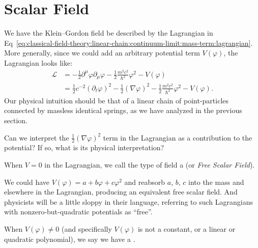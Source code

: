 \section{Scalar Field}

\M
We have the Klein--Gordon field
be described by the Lagrangian in
Eq~\eqref{eq:classical-field-theory:linear-chain:continuum-limit:mass-term:lagrangian}.
More generally, since we could add an arbitrary potential term
$V(\varphi)$, the Lagrangian looks like:
\begin{equation}\label{eq:classical-field-theory:scalar-field:lagrangian}
\begin{split}
  \mathcal{L} &= -\frac{1}{2}\partial^{\mu}\varphi\partial_{\mu}\varphi
-\frac{1}{2}\frac{m^{2}c^{2}}{\hbar^{2}}\varphi^{2} - V(\varphi)\\
&=\frac{1}{2}c^{-2}(\partial_{t}\varphi)^{2}-\frac{1}{2}(\nabla\varphi)^{2}
-\frac{1}{2}\frac{m^{2}c^{2}}{\hbar^{2}}\varphi^{2} - V(\varphi).
\end{split}
\end{equation}
Our physical intuition should be that of a linear chain of
point-particles connected by massless identical springs, as we have
analyzed in the previous section.

\begin{exercise}
Can we interpret the $\frac{1}{2}(\nabla\varphi)^{2}$ term in the
Lagrangian as a contribution to the potential? If so, what is its
physical interpretation?
\end{exercise}

\begin{definition}
When $V=0$ in the Lagrangian, we call the type of field a
 (or \emph{Free Scalar Field}).
\end{definition}

\begin{remark}
We could have $V(\varphi) = a + b\varphi + c\varphi^{2}$ and reabsorb
$a$, $b$, $c$ into the mass and elsewhere in the Lagrangian, producing
an equivalent free scalar field. And physicists will be a little sloppy
in their language, referring to such Lagrangians with
nonzero-but-quadratic potentials as ``free''.
\end{remark}

\begin{definition}
When $V(\varphi)\neq0$ (and specifically $V(\varphi)$ is not a constant,
or a linear or quadratic polynomial), we say we have a
.
\end{definition}

